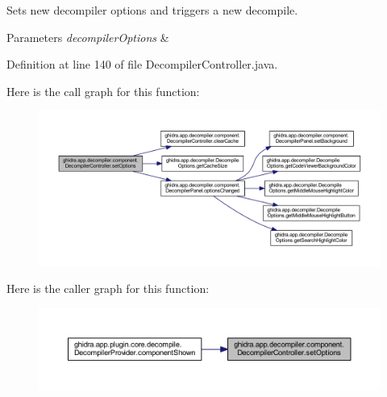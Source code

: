 Sets new decompiler options and triggers a new decompile. 
\begin{DoxyParams}{Parameters}
{\em decompiler\+Options} & \\
\hline
\end{DoxyParams}


Definition at line 140 of file Decompiler\+Controller.\+java.

Here is the call graph for this function\+:
\nopagebreak
\begin{figure}[H]
\begin{center}
\leavevmode
\includegraphics[width=350pt]{classghidra_1_1app_1_1decompiler_1_1component_1_1_decompiler_controller_aaf14081587bb40519aafb382238d5a5d_cgraph}
\end{center}
\end{figure}
Here is the caller graph for this function\+:
\nopagebreak
\begin{figure}[H]
\begin{center}
\leavevmode
\includegraphics[width=350pt]{classghidra_1_1app_1_1decompiler_1_1component_1_1_decompiler_controller_aaf14081587bb40519aafb382238d5a5d_icgraph}
\end{center}
\end{figure}
\mbox{\label{classghidra_1_1app_1_1decompiler_1_1component_1_1_decompiler_controller_ab8b004d5f993e1514406f07c0878794e}} 
